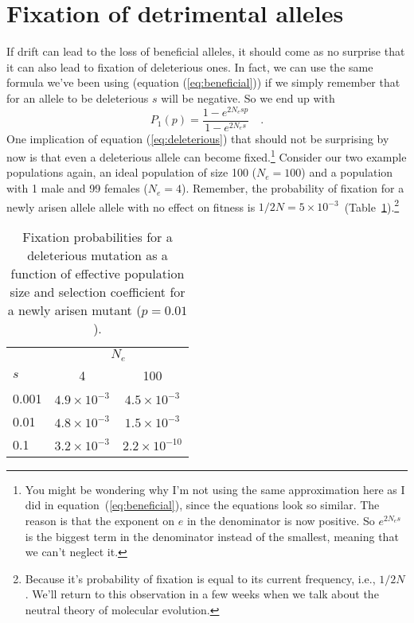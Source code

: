 \documentclass[12pt]{article}
\begin{document}
\section*{Fixation of detrimental alleles}

If drift can lead to the loss of beneficial alleles, it should come as
no surprise that it can also lead to fixation of deleterious ones. In
fact, we can use the same formula we've been using (equation
(\ref{eq:beneficial})) if we simply remember that for an allele to be
deleterious $s$ will be negative. So we end up with
\begin{equation}
P_1(p) = \frac{1 - e^{2N_esp}}{1 - e^{2N_es}} \quad .
\label{eq:deleterious}
\end{equation}
One implication of equation (\ref{eq:deleterious}) that should not be
surprising by now is that even a deleterious allele can become
fixed.\footnote{You might be wondering why I'm not using the same
  approximation here as I did in equation~(\ref{eq:beneficial}), since
  the equations look so similar. The reason is that the exponent on
  $e$ in the denominator is now positive. So $e^{2N_es}$ is the
  biggest term in the denominator instead of the smallest, meaning
  that we can't neglect it.} Consider our two example populations
again, an ideal population of size 100 ($N_e = 100$) and a population
with 1 male and 99 females ($N_e = 4$). Remember, the probability of
fixation for a newly arisen allele allele with no effect on fitness is
$1/2N = 5 \times
10^{-3}$~(Table~\ref{table:fixation}).\footnote{Because
  it's probability of fixation is equal to its current frequency,
  i.e., $1/2N$. We'll return to this observation in a few weeks when
  we talk about the neutral theory of molecular evolution.}

\begin{table}
\begin{center}
\begin{tabular}{l|cc}
\hline\hline
      & \multicolumn{2}{c}{$N_e$} \\
$s$   & 4                  & 100 \\
\hline
0.001 & $4.9 \times 10^{-3}$ & $4.5 \times 10^{-3}$ \\
0.01  & $4.8 \times 10^{-3}$ & $1.5 \times 10^{-3}$ \\
0.1   & $3.2 \times 10^{-3}$ & $2.2 \times 10^{-10}$ \\
\hline
\end{tabular}
\end{center}
\caption{Fixation probabilities for a deleterious mutation as a
function of effective population size and selection coefficient for a
newly arisen mutant ($p=0.01$).}\label{table:fixation}
\end{table}
\end{document}
